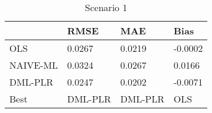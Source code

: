 \begin{table}[H]
\centering
\caption{Scenario 1}
\label{Scenario1}
\begin{tabular}{L{3.3333333333333335cm}L{2.6666666666666665cm}R{2.0cm}R{2.6666666666666665cm}}
\toprule
{} &     RMSE &      MAE &    Bias \\
\midrule
OLS      &   0.0267 &   0.0219 & -0.0002 \\
NAIVE-ML &   0.0324 &   0.0267 &  0.0166 \\
DML-PLR  &   0.0247 &   0.0202 & -0.0071 \\
Best     &  DML-PLR &  DML-PLR &     OLS \\
\bottomrule
\end{tabular}
\end{table}
